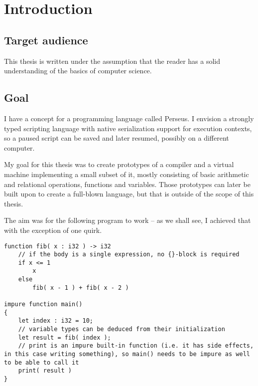 
\chapter{Introduction} %

    
    \section{Target audience}
    This thesis is written under the assumption that the reader has a solid understanding of the basics of computer science.

	\section{Goal} %
	
	I have a concept for a programming language called Perseus. I envision a strongly typed scripting language with native serialization support for execution contexts, so a paused script can be saved and later resumed, possibly on a different computer.
	
	My goal for this thesis was to create prototypes of a compiler and a virtual machine implementing a small subset of it, mostly consisting of basic arithmetic and relational operations, functions and variables. Those prototypes can later be built upon to create a full-blown language, but that is outside of the scope of this thesis.
	
	The aim was for the following program to work -- as we shall see, I achieved that with the exception of one quirk.
	
	\lstperseus
	\begin{lstlisting}[caption={Desired target language}]
function fib( x : i32 ) -> i32
    // if the body is a single expression, no {}-block is required
    if x <= 1
        x
    else
        fib( x - 1 ) + fib( x - 2 )

impure function main()
{
	let index : i32 = 10;
	// variable types can be deduced from their initialization
	let result = fib( index );
	// print is an impure built-in function (i.e. it has side effects, in this case writing something), so main() needs to be impure as well to be able to call it
	print( result )
}
	\end{lstlisting}
	
